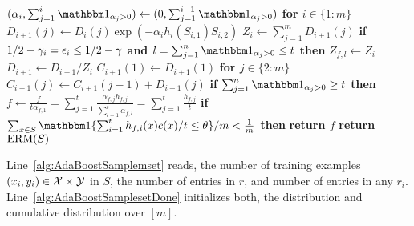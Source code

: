\begin{algorithm}[H]
\begin{algorithmic}[1]
\State\hspace{1cm}\vline\quad$(\alpha_i,\sum_{j=1}^{i}\ind_{\alpha_j>0})\gets(0,\sum_{j=1}^{i-1}\ind_{\alpha_j>0})$ \label{alg:AdaBoostSamplezeroweight}
\State\hspace{0.5cm}\vline\quad\textbf{for $ i \in \{ 1:m \}$ }\label{alg:AdaBoostSampleupdatestart}
\State\hspace{1cm}\vline\quad$D_{i+1}(j)\gets D_{i}(j)\exp(-\alpha_i h_i(S_{i,1}) S_{i,2})$\label{alg:AdaBoostSamplegetweights}
\State\hspace{0.5cm}\vline\quad$Z_{i}\gets \sum_{j=1}^{m} D_{i+1}(j)$\label{AdaBoostSamplesetnormalization}
\State\hspace{0.5cm}\vline\quad\textbf{if $1/2-\gamma_{i}=\epsilon_{i}\leq 1/2-\gamma$ and $l=\sum_{j=1}^{n}\ind_{\alpha_j>0}\leq t$ then}
\State\hspace{1cm}\vline\quad $ Z_{f,l}\gets Z_{i} $\label{alg:AdaBoostSamplegetsZ} 
\State\hspace{0.5cm}\vline\quad$D_{i+1}\gets D_{i+1}/Z_{i}$\label{alg:AdaBoostSamplenormalizing}
\State\hspace{0.5cm}\vline\quad$C_{i+1}(1)\gets D_{i+1}(1)$\label{alg:AdaBoostSamplecummlativeupdate}
\State\hspace{0.5cm}\vline\quad\textbf{for $ j\in\{ 2:m \} $  }
\State\hspace{1cm}\vline\quad$C_{i+1}(j)\gets C_{i+1}(j-1)+D_{i+1}(j)$  \label{alg:AdaBoostsampleendforloop}
\State\textbf{if $\sum_{j=1}^{n}\ind_{\alpha_j>0}\geq t$ then}\label{alg:AdaBoostSamplecheckt}
\State\hspace{0.5cm}\vline\quad$f \gets \frac{f}{t\alpha_{f,1}}=\sum_{j=1}^{t} \frac{\alpha_{f,j}h_{f,j}}{\sum_{l=1}^{t}{\alpha_{f,l}}}=\sum_{j=1}^{t} \frac{h_{f,j}}{t}$ \label{alg:AdaBoostsample:output1} 
\State\hspace{0.5cm}\vline\quad\textbf{if $\sum_{x\in S} \ind\{\sum_{i=1}^{t} h_{f,i}(x)c(x)/t\leq \theta \}/m < \frac{1}{m}$ then}\label{alg:AdaBoostSamplecheckingmargin}
\State\hspace{1cm}\vline\quad\textbf{return $f$}\label{alg:AdaBoostSampleoutputgood}
\State\textbf{return $ \mathrm{ERM}(S) $ }\label{alg:AdaBoostsample:output2}\label{alg:AdaBoostsample:output3}
\end{algorithmic}
\end{algorithm}
Line~\ref{alg:AdaBoostSamplemset} reads, the number of training examples $(x_i,y_i)\in\mathcal{X}\times \mathcal{Y}$ in $S$, the number of entries in $r$, and number of entries in any $r_i$. 
Line~\ref{alg:AdaBoostSamplesetDone} initializes both, the distribution and cumulative distribution over $[m]$. 
